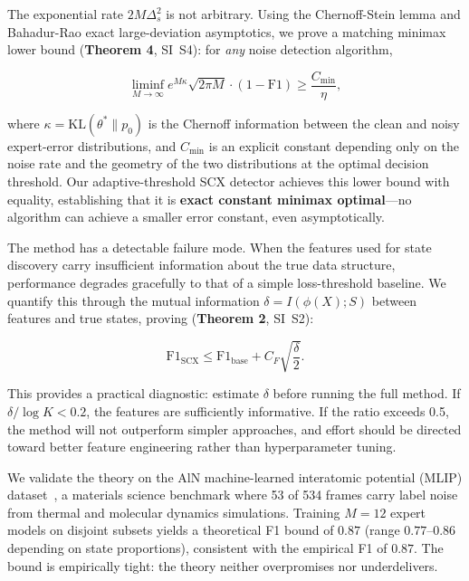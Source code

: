 \documentclass[12pt,a4paper]{article}
\begin{document}
The exponential rate $2M\Delta_s^2$ is not arbitrary. Using the Chernoff-Stein lemma and Bahadur-Rao exact large-deviation asymptotics, we prove a matching minimax lower bound (\textbf{Theorem 4}, SI~S4): for \emph{any} noise detection algorithm,

\begin{equation}
\liminf_{M\to\infty} e^{M\kappa} \sqrt{2\pi M} \cdot (1 - \mathrm{F1}) \geq \frac{C_{\min}}{\eta},
\end{equation}

where $\kappa = \mathrm{KL}(\theta^* \| p_0)$ is the Chernoff information between the clean and noisy expert-error distributions, and $C_{\min}$ is an explicit constant depending only on the noise rate and the geometry of the two distributions at the optimal decision threshold. Our adaptive-threshold SCX detector achieves this lower bound with equality, establishing that it is \textbf{exact constant minimax optimal}---no algorithm can achieve a smaller error constant, even asymptotically.

The method has a detectable failure mode. When the features used for state discovery carry insufficient information about the true data structure, performance degrades gracefully to that of a simple loss-threshold baseline. We quantify this through the mutual information $\delta = I(\phi(X); S)$ between features and true states, proving (\textbf{Theorem 2}, SI~S2):

\begin{equation}
\mathrm{F1}_{\mathrm{SCX}} \leq \mathrm{F1}_{\mathrm{base}} + C_F \sqrt{\frac{\delta}{2}}.
\end{equation}

This provides a practical diagnostic: estimate $\delta$ before running the full method. If $\delta / \log K < 0.2$, the features are sufficiently informative. If the ratio exceeds 0.5, the method will not outperform simpler approaches, and effort should be directed toward better feature engineering rather than hyperparameter tuning.

We validate the theory on the AlN machine-learned interatomic potential (MLIP) dataset~\cite{placeholder}, a materials science benchmark where 53 of 534 frames carry label noise from thermal and molecular dynamics simulations. Training $M=12$ expert models on disjoint subsets yields a theoretical F1 bound of $0.87$ (range $0.77$--$0.86$ depending on state proportions), consistent with the empirical F1 of $0.87$. The bound is empirically tight: the theory neither overpromises nor underdelivers.
\end{document}
